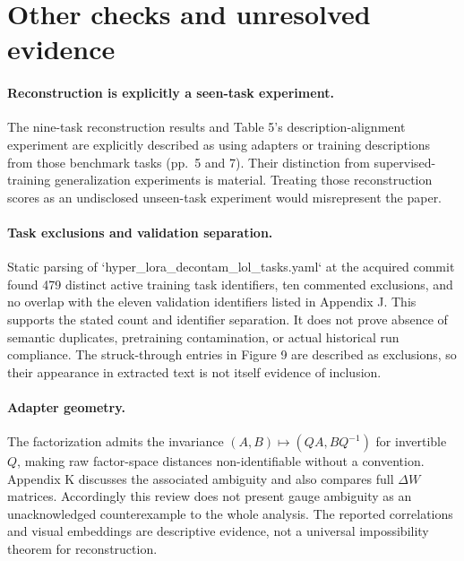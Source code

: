 \documentclass[10pt]{article}
\begin{document}
\section*{Other checks and unresolved evidence}
\paragraph*{Reconstruction is explicitly a seen-task experiment.}\mbox{}\par
The nine-task reconstruction results and Table 5’s description-alignment experiment are explicitly described as using adapters or training descriptions from those benchmark tasks (pp. 5 and 7). Their distinction from supervised-training generalization experiments is material. Treating those reconstruction scores as an undisclosed unseen-task experiment would misrepresent the paper.\par
\paragraph*{Task exclusions and validation separation.}\mbox{}\par
Static parsing of `hyper\_lora\_decontam\_lol\_tasks.yaml` at the acquired commit found 479 distinct active training task identifiers, ten commented exclusions, and no overlap with the eleven validation identifiers listed in Appendix J. This supports the stated count and identifier separation. It does not prove absence of semantic duplicates, pretraining contamination, or actual historical run compliance. The struck-through entries in Figure 9 are described as exclusions, so their appearance in extracted text is not itself evidence of inclusion.\par
\paragraph*{Adapter geometry.}\mbox{}\par
The factorization admits the invariance \((A,B)\mapsto(QA,BQ^{-1})\) for invertible \(Q\), making raw factor-space distances non-identifiable without a convention. Appendix K discusses the associated ambiguity and also compares full \(\Delta W\) matrices. Accordingly this review does not present gauge ambiguity as an unacknowledged counterexample to the whole analysis. The reported correlations and visual embeddings are descriptive evidence, not a universal impossibility theorem for reconstruction.\par
\end{document}
